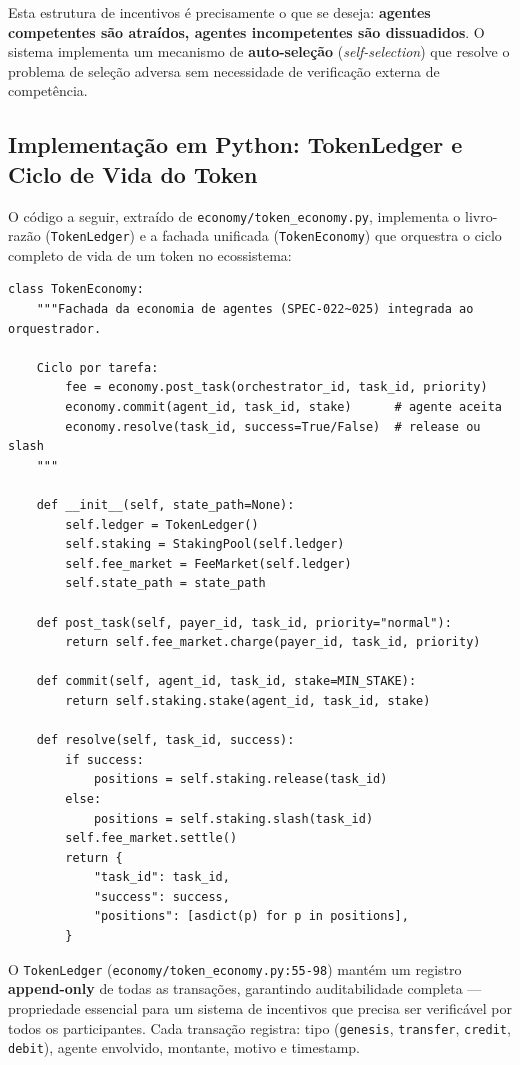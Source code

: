 Esta estrutura de incentivos é precisamente o que se deseja: \textbf{agentes competentes são atraídos, agentes incompetentes são dissuadidos}. O sistema implementa um mecanismo de \textbf{auto-seleção} (\textit{self-selection}) que resolve o problema de seleção adversa sem necessidade de verificação externa de competência.

\subsection{Implementação em Python: TokenLedger e Ciclo de Vida do Token}

O código a seguir, extraído de \texttt{economy/token\_economy.py}, implementa o livro-razão (\texttt{TokenLedger}) e a fachada unificada (\texttt{TokenEconomy}) que orquestra o ciclo completo de vida de um token no ecossistema:

\begin{verbatim}
class TokenEconomy:
    """Fachada da economia de agentes (SPEC-022~025) integrada ao orquestrador.

    Ciclo por tarefa:
        fee = economy.post_task(orchestrator_id, task_id, priority)
        economy.commit(agent_id, task_id, stake)      # agente aceita
        economy.resolve(task_id, success=True/False)  # release ou slash
    """

    def __init__(self, state_path=None):
        self.ledger = TokenLedger()
        self.staking = StakingPool(self.ledger)
        self.fee_market = FeeMarket(self.ledger)
        self.state_path = state_path

    def post_task(self, payer_id, task_id, priority="normal"):
        return self.fee_market.charge(payer_id, task_id, priority)

    def commit(self, agent_id, task_id, stake=MIN_STAKE):
        return self.staking.stake(agent_id, task_id, stake)

    def resolve(self, task_id, success):
        if success:
            positions = self.staking.release(task_id)
        else:
            positions = self.staking.slash(task_id)
        self.fee_market.settle()
        return {
            "task_id": task_id,
            "success": success,
            "positions": [asdict(p) for p in positions],
        }
\end{verbatim}

O \texttt{TokenLedger} (\texttt{economy/token\_economy.py:55-98}) mantém um registro \textbf{append-only} de todas as transações, garantindo auditabilidade completa --- propriedade essencial para um sistema de incentivos que precisa ser verificável por todos os participantes. Cada transação registra: tipo (\texttt{genesis}, \texttt{transfer}, \texttt{credit}, \texttt{debit}), agente envolvido, montante, motivo e timestamp.

